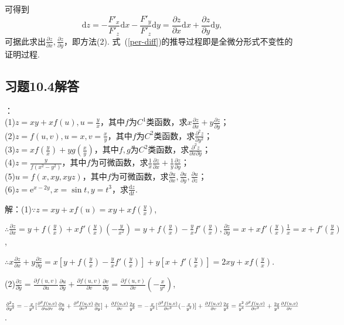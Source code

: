 \documentclass[12pt,UTF8]{ctexart}
\begin{document}
可得到
\[
\mathrm dz=-\frac{F'_x}{F'_z}\mathrm dx-\frac{F'_y}{F'_z}\mathrm dy=\frac{\partial z}{\partial x}\mathrm dx+\frac{\partial z}{\partial y}\mathrm dy,
\]
可据此求出$\frac{\partial z}{\partial x},\frac{\partial z}{\partial y}$，即方法(2). 式~(\ref{per-diff})的推导过程即是全微分形式不变性的证明过程.
\subsection{习题10.4解答}
\begin{enumerate}
：\\
(1)$z=xy+xf(u),u=\frac yx$，其中$f$为$C^1$类函数，求$x\frac{\partial z}{\partial x}+y\frac{\partial z}{\partial y}$；\\
(2)$z=f(u,v),u=x,v=\frac xy$，其中$f$为$C^2$类函数，求$\frac{\partial^2z}{\partial y^2}$；\\
(3)$z=xf(\frac yx)+yg(\frac xy)$，其中$f,g$为$C^2$类函数，求$\frac{\partial^2z}{\partial x\partial y}$；\\
(4)$z=\frac y{f(x^2-y^2)}$，其中$f$为可微函数，求$\frac1x\frac{\partial z}{\partial x}+\frac1y\frac{\partial z}{\partial y}$；\\
(5)$u=f(x,xy,xyz)$，其中$f$为可微函数，求$\frac{\partial u}{\partial x},\frac{\partial u}{\partial y},\frac{\partial u}{\partial z}$；\\
(6)$z=\mathrm e^{x-2y},x=\sin t,y=t^3$，求$\frac{\mathrm dz}{\mathrm dt}$.

解：(1)$\because z=xy+xf(u)=xy+xf(\frac yx)$,

$\therefore\frac{\partial z}{\partial x}=y+f(\frac yx)+xf'(\frac yx)(-\frac y{x^2})=y+f(\frac yx)-\frac yxf'(\frac yx),\frac{\partial z}{\partial y}=x+xf'(\frac yx)\frac1x=x+f'(\frac yx)$,

$\therefore x\frac{\partial z}{\partial x}+y\frac{\partial z}{\partial y}=x[y+f(\frac yx)-\frac yxf'(\frac yx)]+y[x+f'(\frac yx)]=2xy+xf(\frac yx)$.

(2)$\frac{\partial z}{\partial y}=\frac{\partial f(u,v)}{\partial u}\frac{\partial u}{\partial y}+\frac{\partial f(u,v)}{\partial v}\frac{\partial v}{\partial y}=\frac{\partial f(u,v)}{\partial v}(-\frac x{y^2})$,

$\frac{\partial^2z}{\partial y^2}=-\frac x{y^2}[\frac{\partial^2f(u,v)}{\partial u\partial v}\frac{\partial u}{\partial y}+\frac{\partial^2f(u,v)}{\partial v^2}\frac{\partial v}{\partial y}]+\frac{\partial f(u,v)}{\partial v}\frac{2x}{y^3}=-\frac x{y^2}[\frac{\partial^2f(u,v)}{\partial v^2}(-\frac x{y^2})]+\frac{\partial f(u,v)}{\partial v}\frac{2x}{y^3}\\
=\frac{x^2}{y^4}\frac{\partial^2f(u,v)}{\partial v^2}+\frac{2x}{y^3}\frac{\partial f(u,v)}{\partial v}$.


\end{enumerate}
\end{document}
